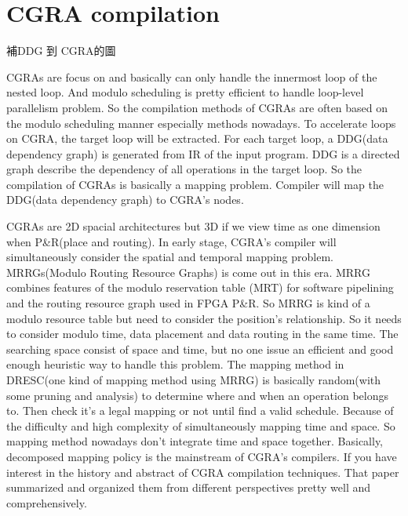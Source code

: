 
\chapter{CGRA compilation}
補DDG 到 CGRA的圖

CGRAs are focus on and basically can only handle the innermost loop of the nested loop\cite{LLP}. And modulo scheduling is pretty efficient to handle loop-level parallelism problem. So the compilation methods of CGRAs are often based on the modulo scheduling manner especially methods nowadays. To accelerate loops on CGRA, the target loop will be extracted. For each target loop, a DDG(data dependency graph) is generated from IR of the input program. DDG is a directed graph describe the dependency of all operations in the target loop. So the compilation of CGRAs is basically a mapping problem. Compiler will map the DDG(data dependency graph) to CGRA's nodes. 

CGRAs are 2D spacial architectures but 3D if we view time as one dimension when P\&R(place and routing). In early stage, CGRA's compiler will simultaneously consider the spatial and temporal mapping problem. MRRGs(Modulo Routing Resource Graphs) is come out in this era\cite{ARC}. MRRG combines features of the modulo reservation table (MRT) for software pipelining and the routing resource graph used in FPGA P\&R\cite{LLP}. So MRRG is kind of a modulo resource table but need to consider the position's relationship. So it needs to consider modulo time, data placement and data routing in the same time. The searching space consist of space and time, but no one issue an efficient and good enough heuristic way to handle this problem. The mapping method in DRESC\cite[]{DRESC}(one kind of mapping method using MRRG) is basically random(with some pruning and analysis) to determine where and when an operation belongs to. Then check it's a legal mapping or not until find a valid schedule. Because of the difficulty and high complexity of simultaneously mapping time and space. So mapping method nowadays don't integrate time and space together. Basically, decomposed mapping policy is the mainstream of CGRA's compilers. If you have interest in the history and abstract of CGRA compilation techniques. That paper\cite[]{JD} summarized and organized them from different perspectives pretty well and comprehensively. 

